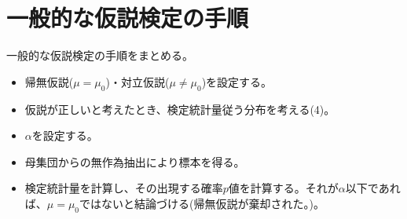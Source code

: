\section{一般的な仮説検定の手順}
一般的な仮説検定の手順をまとめる。
%
\begin{framed}
    \begin{itemize}
        \item 帰無仮説($\mu = \mu_0$)・対立仮説($\mu\neq \mu_0$)を設定する。
        \item 仮説が正しいと考えたとき、検定統計量従う分布を考える(4)。
        \item $\alpha$を設定する。
        \item 母集団からの無作為抽出により標本を得る。
        \item 検定統計量を計算し、その出現する確率$p$値を計算する。それが$\alpha$以下であれば、$\mu=\mu_0$ではないと結論づける(帰無仮説が棄却された。)。%
    \end{itemize}
\end{framed}
\fi





